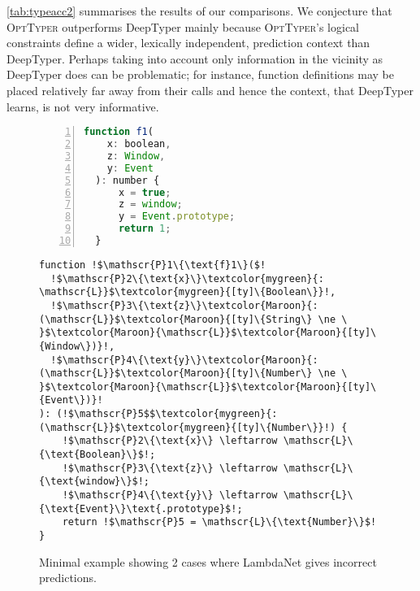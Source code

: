 \documentclass[acmsmall, review, anonymous]{acmart}\settopmatter{printfolios=true,printccs=false,printacmref=false}
\newcommand{\projectname}{\textsc{OptTyper}\xspace}
\begin{document}
\cref{tab:typeacc2} summarises the results of our comparisons. We conjecture that \projectname outperforms DeepTyper mainly because \projectname's logical constraints define
a wider, lexically independent, prediction context than DeepTyper.
Perhaps taking into account only information in the vicinity as DeepTyper does can be problematic;
for instance, function definitions may be placed relatively far away from their calls and hence the context, that DeepTyper learns, is not very informative.
\begin{figure}[!t]
    \centering
    \begin{minipage}[t]{.38\textwidth}
        \raggedright
\begin{lstlisting}[language=JavaScript,label={lst:gold}, numbers=left]
  function f1(
    x: boolean,
    z: Window,
    y: Event
  ): number {
      x = true;
      z = window;
      y = Event.prototype;
      return 1;
  }
\end{lstlisting}
   \vspace{-5mm}
    \end{minipage}
    \begin{minipage}[t]{.57\textwidth}
        \raggedleft
\begin{lstlisting}[language=Fake,label={lst:lncode}] 
function !$\mathscr{P}1\{\text{f}1\}($!
  !$\mathscr{P}2\{\text{x}\}\textcolor{mygreen}{: \mathscr{L}}$\textcolor{mygreen}{[ty]\{Boolean\}}!,
  !$\mathscr{P}3\{\text{z}\}\textcolor{Maroon}{: (\mathscr{L}}$\textcolor{Maroon}{[ty]\{String\} \ne \ }$\textcolor{Maroon}{\mathscr{L}}$\textcolor{Maroon}{[ty]\{Window\})}!,
  !$\mathscr{P}4\{\text{y}\}\textcolor{Maroon}{: (\mathscr{L}}$\textcolor{Maroon}{[ty]\{Number\} \ne \ }$\textcolor{Maroon}{\mathscr{L}}$\textcolor{Maroon}{[ty]\{Event\})}!
): (!$\mathscr{P}5$$\textcolor{mygreen}{: (\mathscr{L}}$\textcolor{mygreen}{[ty]\{Number\}}!) {
    !$\mathscr{P}2\{\text{x}\} \leftarrow \mathscr{L}\{\text{Boolean}\}$!;
    !$\mathscr{P}3\{\text{z}\} \leftarrow \mathscr{L}\{\text{window}\}$!;
    !$\mathscr{P}4\{\text{y}\} \leftarrow \mathscr{L}\{\text{Event}\}\text{.prototype}$!;
    return !$\mathscr{P}5 = \mathscr{L}\{\text{Number}\}$!
}
\end{lstlisting}
    \vspace{-5mm}
    \end{minipage}
    \caption{Minimal example showing 2 cases where LambdaNet gives incorrect predictions.}\label{fig:LambdaNet}
\end{figure}
\end{document}
